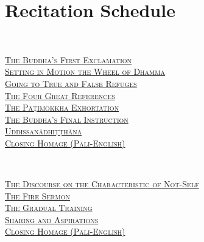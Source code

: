 \chapter{Recitation Schedule}

\label{schedule}

{\centering

  {\libertinusFont\selectfont\textbf{\textsc{\fontsize{18}{12}\selectfont{}}}}\\

  \textsc{\fontsize{14.4}{28}\selectfont
    \hyperref[buddhas-first-exclamation]{The Buddha's First Exclamation} \ifdesktopversion\else\pageref{buddhas-first-exclamation}\fi\\
    \hyperref[wheel-of-dhamma-abridged]{Setting in Motion the Wheel of Dhamma} \ifdesktopversion\else\pageref{wheel-of-dhamma-abridged}\fi\\
    \hyperref[true-false-refuges]{Going to True and False Refuges} \ifdesktopversion\else\pageref{true-false-refuges}\fi\\
    \hyperref[four-great-references]{The Four Great References} \ifdesktopversion\else\pageref{four-great-references}\fi\\
    \hyperref[patimokkha-exhortation]{The Pāṭimokkha Exhortation} \ifdesktopversion\else\pageref{patimokkha-exhortation}\fi\\
    \hyperref[buddhas-final-instruction]{The Buddha's Final Instruction} \ifdesktopversion\else\pageref{buddhas-final-instruction}\fi\\
    \hyperref[uddissanadhitthana]{Uddissanādhiṭṭhāna} \ifdesktopversion\else\pageref{uddissanadhitthana}\fi\\
    \hyperref[closing-homage]{Closing Homage (Pāli-English)} \ifdesktopversion\else\pageref{closing-homage}\fi\\
  }

  \vspace{1.0cm}

  {\libertinusFont\selectfont\textbf{\textsc{\fontsize{18}{12}\selectfont{}}}}\\

  \textsc{\fontsize{14.4}{28}\selectfont
    \hyperref[characteristic-of-not-self]{The Discourse on the Characteristic of Not-Self} \ifdesktopversion\else\pageref{characteristic-of-not-self}\fi\\
    \hyperref[fire-sermon]{The Fire Sermon} \ifdesktopversion\else\pageref{fire-sermon}\fi\\
    \hyperref[gradual-training]{The Gradual Training} \ifdesktopversion\else\pageref{gradual-training}\fi\\
    \hyperref[sharing-aspirations]{Sharing and Aspirations} \ifdesktopversion\else\pageref{sharing-aspirations}\fi\\
    \hyperref[closing-homage]{Closing Homage (Pāli-English)} \ifdesktopversion\else\pageref{closing-homage}\fi\\
  }

}
